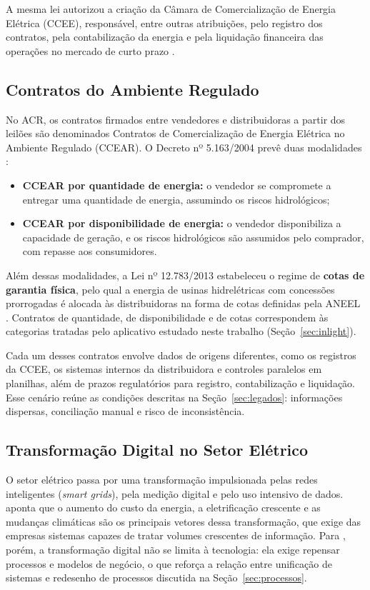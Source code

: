 A mesma lei autorizou a criação da Câmara de Comercialização de Energia Elétrica (CCEE), responsável, entre outras atribuições, pelo registro dos contratos, pela contabilização da energia e pela liquidação financeira das operações no mercado de curto prazo \citep{brasil2004lei,ccee2023}.

\subsection{Contratos do Ambiente Regulado}

No ACR, os contratos firmados entre vendedores e distribuidoras a partir dos leilões são denominados Contratos de Comercialização de Energia Elétrica no Ambiente Regulado (CCEAR). O Decreto nº 5.163/2004 prevê duas modalidades \citep{brasil2004decreto}:

\begin{itemize}
    \item \textbf{CCEAR por quantidade de energia:} o vendedor se compromete a entregar uma quantidade de energia, assumindo os riscos hidrológicos;
    \item \textbf{CCEAR por disponibilidade de energia:} o vendedor disponibiliza a capacidade de geração, e os riscos hidrológicos são assumidos pelo comprador, com repasse aos consumidores.
\end{itemize}

Além dessas modalidades, a Lei nº 12.783/2013 estabeleceu o regime de \textbf{cotas de garantia física}, pelo qual a energia de usinas hidrelétricas com concessões prorrogadas é alocada às distribuidoras na forma de cotas definidas pela ANEEL \citep{brasil2013lei}. Contratos de quantidade, de disponibilidade e de cotas correspondem às categorias tratadas pelo aplicativo estudado neste trabalho (Seção~\ref{sec:inlight}).

Cada um desses contratos envolve dados de origens diferentes, como os registros da CCEE, os sistemas internos da distribuidora e controles paralelos em planilhas, além de prazos regulatórios para registro, contabilização e liquidação. Esse cenário reúne as condições descritas na Seção~\ref{sec:legados}: informações dispersas, conciliação manual e risco de inconsistência.

\subsection{Transformação Digital no Setor Elétrico}

O setor elétrico passa por uma transformação impulsionada pelas redes inteligentes (\textit{smart grids}), pela medição digital e pelo uso intensivo de dados. \citet{farhangi2010} aponta que o aumento do custo da energia, a eletrificação crescente e as mudanças climáticas são os principais vetores dessa transformação, que exige das empresas sistemas capazes de tratar volumes crescentes de informação. Para \citet{westerman2014}, porém, a transformação digital não se limita à tecnologia: ela exige repensar processos e modelos de negócio, o que reforça a relação entre unificação de sistemas e redesenho de processos discutida na Seção~\ref{sec:processos}.

